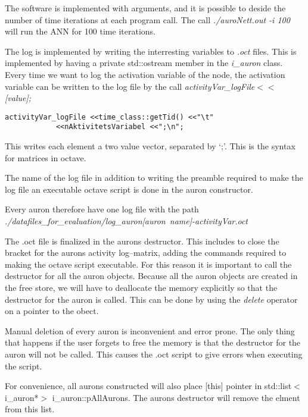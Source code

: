 The software is implemented with arguments, and it is possible to deside the number of time iterations at each program call.
The call \emph{./auroNett.out -i 100} will run the ANN for 100 time iterations.

The log is implemented by writing the interresting variables to \emph{.oct} files. This is implemented by having a private std::ostream member in the \emph{i\_auron} class.
Every time we want to log the activation variable of the node, the activation variable can be written to the log file by the call \emph{activityVar\_logFile$<<$ [value];}
\begin{lstlisting}
activityVar_logFile <<time_class::getTid() <<"\t" 
  		    <<nAktivitetsVariabel <<";\n";
\end{lstlisting}

This writes each element a two value vector, separated by `;'. This is the syntax for matrices in octave.

The name of the log file in addition to writing the preamble required to make the log file an executable octave script is done in the auron constructor.

Every auron therefore have one log file with the path \\ \mbox{\emph{./datafiles\_for\_evaluation/log\_auron[auron name]-activityVar.oct }}

The .oct file is finalized in the aurons destructor. This includes to close the bracket for the aurons activity log--matrix, adding the commands required to making the octave script executable.
For this reason it is important to call the destructor for all the auron objects. 
Because all the auron objects are created in the free store, we will have to deallocate the memory explicitly so that the destructor for the auron is called. 
This can be done by using the \emph{delete} operator on a pointer to the obect.

Manual deletion of every auron is inconvenient and error prone. The only thing that happens if the user forgets to free the memory is that the destructor for the auron will not be called. 
This causes the .oct script to give errors when executing the script.

For convenience, all aurons constructed will also place [this] pointer in std::list$<$i\_auron*$>$ i\_auron::pAllAurons.
The aurons destructor will remove the elment from this list.

